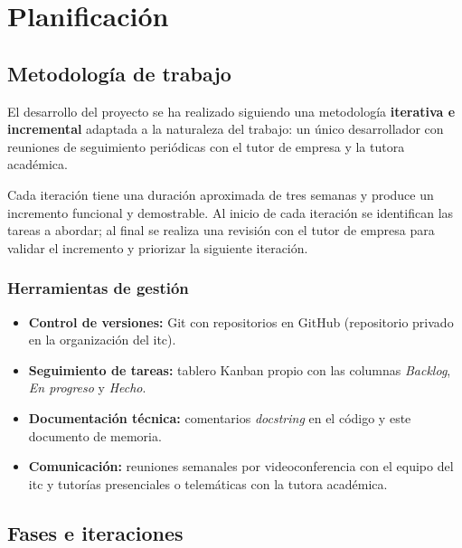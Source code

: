 \chapter{Planificación}
\label{ch:planificacion}

\section{Metodología de trabajo}
\label{sec:metodologia}

El desarrollo del proyecto se ha realizado siguiendo una metodología \textbf{iterativa e
incremental} adaptada a la naturaleza del trabajo: un único desarrollador con reuniones de
seguimiento periódicas con el tutor de empresa y la tutora académica.

Cada iteración tiene una duración aproximada de tres semanas y produce un incremento
funcional y demostrable. Al inicio de cada iteración se identifican las tareas a abordar;
al final se realiza una revisión con el tutor de empresa para validar el incremento y
priorizar la siguiente iteración.

\subsection{Herramientas de gestión}
\label{subsec:herramientas-gestion}

\begin{itemize}
  \item \textbf{Control de versiones:} Git con repositorios en GitHub (repositorio
    privado en la organización del \gls{itc}).
  \item \textbf{Seguimiento de tareas:} tablero Kanban propio con las columnas
    \textit{Backlog}, \textit{En progreso} y \textit{Hecho}.
  \item \textbf{Documentación técnica:} comentarios \textit{docstring} en el código y
    este documento de memoria.
  \item \textbf{Comunicación:} reuniones semanales por videoconferencia con el equipo del
    \gls{itc} y tutorías presenciales o telemáticas con la tutora académica.
\end{itemize}

\section{Fases e iteraciones}
\label{sec:fases}

